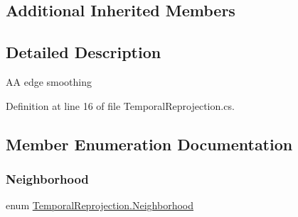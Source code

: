 \subsection*{Additional Inherited Members}


\subsection{Detailed Description}
AA edge smoothing 



Definition at line 16 of file Temporal\+Reprojection.\+cs.



\subsection{Member Enumeration Documentation}
\mbox{\label{class_temporal_reprojection_a6b3343c06d004430c301f11de9bc732c}} 
\subsubsection{\texorpdfstring{Neighborhood}{Neighborhood}}
{\footnotesize\ttfamily enum \mbox{\hyperlink{class_temporal_reprojection_a6b3343c06d004430c301f11de9bc732c}{Temporal\+Reprojection.\+Neighborhood}}\hspace{0.3cm}{\ttfamily [strong]}}

